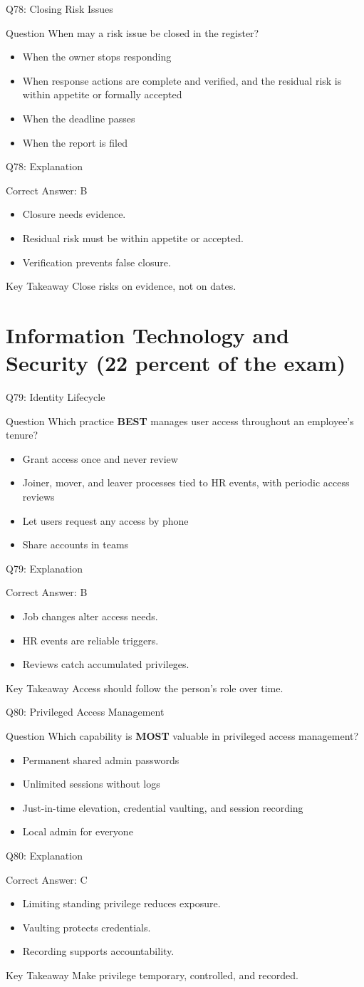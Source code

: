 \documentclass[aspectratio=169]{beamer}
\newcommand{\hq}[7]{%
	\begin{frame}{Q#1: #2}
		\begin{block}{Question}
			#3
		\end{block}
		\begin{itemize}
			#4
		\end{itemize}
	\end{frame}
	\begin{frame}{Q#1: Explanation}
		\begin{block}{Correct Answer: #5}
			\begin{itemize}
				#6
			\end{itemize}
		\end{block}
		\begin{alertblock}{Key Takeaway}
			#7
		\end{alertblock}
	\end{frame}
}
\begin{document}
	\hq{78}{Closing Risk Issues}
	{When may a risk issue be closed in the register?}
	{\item[\textbf{(A)}] When the owner stops responding
		\item[\textbf{(B)}] When response actions are complete and verified, and the residual risk is within appetite or formally accepted
		\item[\textbf{(C)}] When the deadline passes
		\item[\textbf{(D)}] When the report is filed}
	{B}
	{\item Closure needs evidence.
		\item Residual risk must be within appetite or accepted.
		\item Verification prevents false closure.}
	{Close risks on evidence, not on dates.}

	\section{Information Technology and Security (22 percent of the exam)}

	\hq{79}{Identity Lifecycle}
	{Which practice \textbf{BEST} manages user access throughout an employee's tenure?}
	{\item[\textbf{(A)}] Grant access once and never review
		\item[\textbf{(B)}] Joiner, mover, and leaver processes tied to HR events, with periodic access reviews
		\item[\textbf{(C)}] Let users request any access by phone
		\item[\textbf{(D)}] Share accounts in teams}
	{B}
	{\item Job changes alter access needs.
		\item HR events are reliable triggers.
		\item Reviews catch accumulated privileges.}
	{Access should follow the person's role over time.}

	\hq{80}{Privileged Access Management}
	{Which capability is \textbf{MOST} valuable in privileged access management?}
	{\item[\textbf{(A)}] Permanent shared admin passwords
		\item[\textbf{(B)}] Unlimited sessions without logs
		\item[\textbf{(C)}] Just-in-time elevation, credential vaulting, and session recording
		\item[\textbf{(D)}] Local admin for everyone}
	{C}
	{\item Limiting standing privilege reduces exposure.
		\item Vaulting protects credentials.
		\item Recording supports accountability.}
	{Make privilege temporary, controlled, and recorded.}
\end{document}
